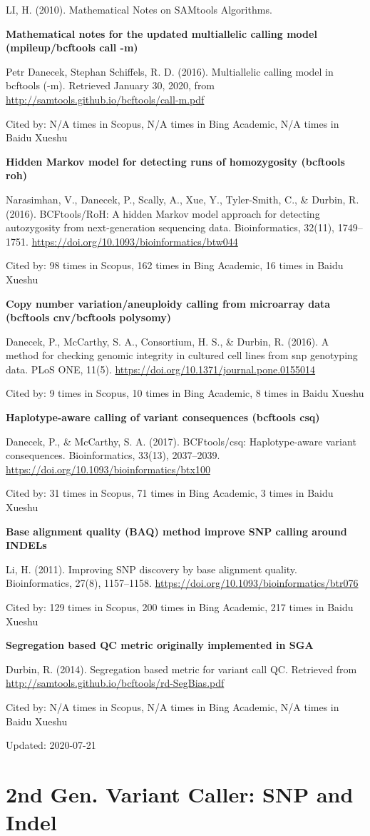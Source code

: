 \documentclass[]{article}
\newcommand{\cb}[3]{\par Cited by: {\color{blue}\Huge #1} times in Scopus, {\color{blue}\Huge #2} times in Bing Academic, {\color{blue}\Huge #3} times in Baidu Xueshu}
\begin{document}
LI, H. (2010). Mathematical Notes on SAMtools Algorithms.

\textbf{Mathematical notes for the updated multiallelic calling model (mpileup/bcftools call -m)}

Petr Danecek, Stephan Schiffels, R. D. (2016). Multiallelic calling model in bcftools (-m). Retrieved January 30, 2020, from \url{http://samtools.github.io/bcftools/call-m.pdf}\cb{N/A}{N/A}{N/A}

\textbf{Hidden Markov model for detecting runs of homozygosity (bcftools roh)}

Narasimhan, V., Danecek, P., Scally, A., Xue, Y., Tyler-Smith, C., \& Durbin, R. (2016). BCFtools/RoH: A hidden Markov model approach for detecting autozygosity from next-generation sequencing data. Bioinformatics, 32(11), 1749–1751. \url{https://doi.org/10.1093/bioinformatics/btw044} \cb{98}{162}{16}

\textbf{Copy number variation/aneuploidy calling from microarray data (bcftools cnv/bcftools polysomy)}

Danecek, P., McCarthy, S. A., Consortium, H. S., \& Durbin, R. (2016). A method for checking genomic integrity in cultured cell lines from snp genotyping data. PLoS ONE, 11(5). \url{https://doi.org/10.1371/journal.pone.0155014}\cb{9}{10}{8}

\textbf{Haplotype-aware calling of variant consequences (bcftools csq)}

Danecek, P., \& McCarthy, S. A. (2017). BCFtools/csq: Haplotype-aware variant consequences. Bioinformatics, 33(13), 2037–2039. \url{https://doi.org/10.1093/bioinformatics/btx100}\cb{31}{71}{3}

\textbf{Base alignment quality (BAQ) method improve SNP calling around INDELs}

Li, H. (2011). Improving SNP discovery by base alignment quality. Bioinformatics, 27(8), 1157–1158. \url{https://doi.org/10.1093/bioinformatics/btr076}\cb{129}{200}{217}

\textbf{Segregation based QC metric originally implemented in SGA}

Durbin, R. (2014). Segregation based metric for variant call QC. Retrieved from \url{http://samtools.github.io/bcftools/rd-SegBias.pdf}\cb{N/A}{N/A}{N/A}

Updated: 2020-07-21

\part{2nd Gen. Variant Caller: SNP and Indel}
\end{document}
